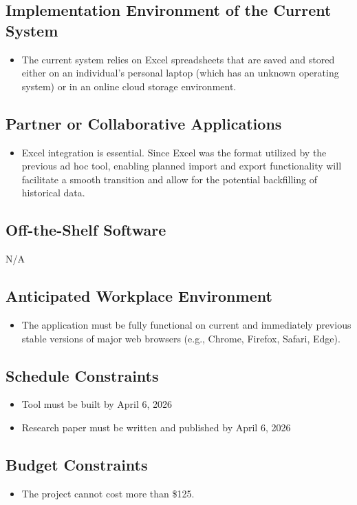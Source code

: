 \documentclass[12pt]{article}
\begin{document}
\subsection{Implementation Environment of the Current System}
\begin{itemize}
  \item The current system relies on Excel spreadsheets that are saved and stored either on an individual's personal laptop (which has an unknown operating system) or in an online cloud storage environment.
\end{itemize}
\subsection{Partner or Collaborative Applications}
\begin{itemize}
  \item Excel integration is essential. Since Excel was the format utilized by the previous ad hoc tool, enabling planned import and export functionality will facilitate a smooth transition and allow for the potential backfilling of historical data.
\end{itemize}
\subsection{Off-the-Shelf Software}
N/A
\subsection{Anticipated Workplace Environment}
\begin{itemize}
  \item  The application must be fully functional on current and immediately previous stable versions of major web browsers (e.g., Chrome, Firefox, Safari, Edge).
\end{itemize}
\subsection{Schedule Constraints}
\begin{itemize}
  \item Tool must be built by April 6, 2026
  \item Research paper must be written and published by April 6, 2026
\end{itemize}
\subsection{Budget Constraints}
\begin{itemize}
  \item The project cannot cost more than \$125.
\end{itemize}
\end{document}
